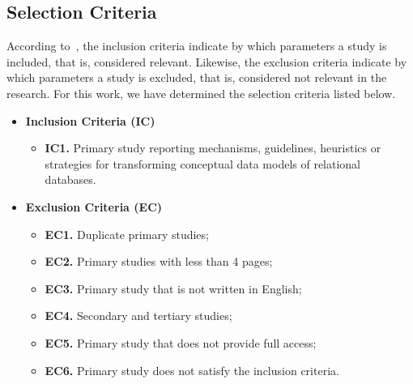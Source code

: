 \subsection{Selection Criteria} \label{ssec_slm:selectionCriteria}

According to~\cite{Kitchenham:2007}, the inclusion criteria indicate by which parameters a study is included, that is, considered relevant.
Likewise, the exclusion criteria indicate by which parameters a study is excluded, that is, considered not relevant in the research.
For this work, we have determined the selection criteria listed below.

\begin{itemize}
    \item \textbf{Inclusion Criteria (IC)}    
    \begin{itemize}
        \item \textbf{IC1.} Primary study reporting mechanisms, guidelines, heuristics or strategies for transforming conceptual data models of relational databases. 
    \end{itemize}
    \item \textbf{Exclusion Criteria (EC)}
    \begin{itemize}
        \item \textbf{EC1.} Duplicate primary studies;
        \item \textbf{EC2.} Primary studies with less than 4 pages;
        \item \textbf{EC3.} Primary study that is not written in English;
        \item \textbf{EC4.} Secondary and tertiary studies;
        \item \textbf{EC5.} Primary study that does not provide full access;
        \item \textbf{EC6.} Primary study does not satisfy the inclusion criteria.
    \end{itemize}
\end{itemize}


